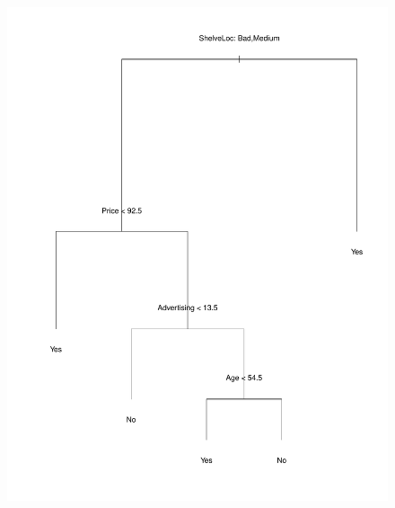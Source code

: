 \documentclass{beamer}
\theoremstyle{definition}
\begin{document}
\begin{frame}
\begin{figure}[h!]
\includegraphics[scale=0.28]{grafo1}
\end{figure}
\end{frame}
\end{document}
